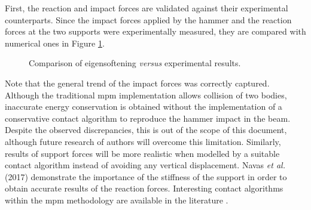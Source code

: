 \documentclass[preprint,12pt,a4paper]{elsarticle}
\begin{document}
First, the reaction and impact forces are validated against their
experimental counterparts. Since the impact forces applied by the
hammer and the reaction forces at the two supports were experimentally
measured, they are compared with numerical ones in Figure
\ref{fig:Reactions-Forces-impact-test}. 
\begin{figure}
  \centering
  \caption{Comparison of eigensoftening \textit{versus} experimental results.}
  \label{fig:Reactions-Forces-impact-test}
\end{figure}
Note that the general trend of the impact forces was correctly
captured. Although the traditional \acrshort{mpm} implementation allows collision of two bodies, inaccurate energy conservation is obtained without the implementation of a conservative contact algorithm to reproduce the hammer impact in the beam.
Despite the observed discrepancies, this is out of the scope of this
document, although future research of authors will overcome this
limitation. Similarly, results of support forces will be more
realistic when modelled by a suitable contact algorithm instead of
avoiding any vertical displacement. Navas {\it et al.}
(2017)\cite{Navas_2017_ES} demonstrate the importance of the stiffness
of the support in order to obtain accurate results of the reaction
forces. Interesting contact algorithms within the \acrshort{mpm}
methodology are available in the literature
\cite{Bardenhagen_Contact_2001,XZhang_Contact_2011}.
\end{document}
